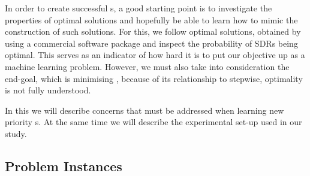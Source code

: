 \documentclass[twocolumn]{svjour3}
\begin{document}
In order to create successful \dr s, a good starting point is to 
investigate the properties of optimal solutions and hopefully be able to learn 
how to mimic the construction of such solutions. For this, we follow optimal 
solutions, 
obtained by using a commercial software package \cite{gurobi} and inspect 
the probability of SDRs being optimal. This serves as an indicator of how hard 
it is to put our objective up as a machine learning problem. 
However, we must also take into consideration the end-goal, which is minimising 
\namerho, because of its relationship to stepwise, optimality is not fully 
understood.

In this  we will describe concerns that must be 
addressed when learning new priority \dr s. At the same time we will describe 
the experimental set-up used in our study. 

\subsection{Problem Instances}\label{sec:data:sim}
\end{document}
